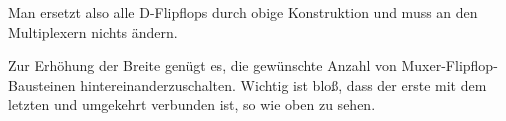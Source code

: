 \documentclass{CInf_practice}
\begin{document}
Man ersetzt also alle D-Flipflops durch obige Konstruktion und muss an den
Multiplexern nichts ändern.

\subex{}

Zur Erhöhung der Breite genügt es, die gewünschte Anzahl von
Muxer-Flipflop-Bausteinen hintereinanderzuschalten. Wichtig ist bloß, dass der
erste mit dem letzten und umgekehrt verbunden ist, so wie oben zu sehen.
\end{document}
